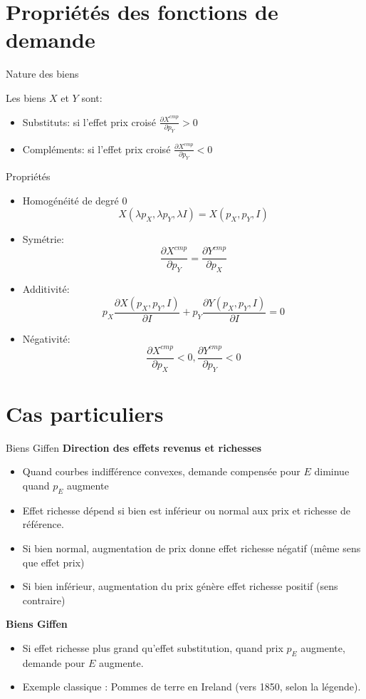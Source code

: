 \documentclass[handout]{beamer}
\newenvironment{iPar}[1]{\textbf{#1} \begin{itemize}}{\end{itemize}}
\newcommand{\cp}{{cmp}}
\begin{document}
\section{Propriétés des fonctions de demande}

\begin{frame}{Nature des biens}

Les biens $X$ et $Y$ sont:
\begin{itemize}
\item Substituts: si l'effet prix croisé $\frac{\partial X^\cp}{\partial p_Y} >0$
\item Compléments: si l'effet prix croisé $\frac{\partial X^\cp}{\partial p_Y} <0$ 
\end{itemize}

\end{frame}

\begin{frame}{Propriétés}

\begin{itemize}
\item Homogénéité de degré 0 $$X(\lambda p_X,\lambda p_Y,\lambda I) = X(p_X,p_Y,I)$$ 
\item Symétrie: $$\frac{\partial X^\cp}{\partial p_Y} =\frac{\partial Y^\cp}{\partial p_X} $$ 
\item Additivité: $$ p_X \frac{\partial X(p_X,p_Y,I)}{\partial I} + p_Y \frac{\partial Y(p_X,p_Y,I)}{\partial I} = 0 $$
\item Négativité: $$\frac{\partial X^\cp}{\partial p_X}<0,\frac{\partial Y^\cp}{\partial p_Y}<0$$

\end{itemize}

\end{frame}

\section{Cas particuliers}

\begin{frame}{Biens Giffen}
\begin{iPar}{Direction des effets revenus et richesses}
\item Quand courbes indifférence convexes, demande compensée pour $E$ diminue quand $p_E$ augmente
\item Effet richesse dépend si bien est inférieur ou normal aux prix et richesse de référence.
\item Si bien normal, augmentation de prix donne effet richesse négatif (même sens que effet prix)
\item Si bien inférieur, augmentation du prix génère effet richesse positif (sens contraire)
\end{iPar}

\begin{iPar}{Biens Giffen}
\item Si effet richesse plus grand qu'effet substitution, quand prix $p_E$ augmente, demande pour $E$ augmente.
\item  Exemple classique : Pommes de terre en Ireland (vers 1850, selon la légende). 
\end{iPar}
\end{frame}
\end{document}
